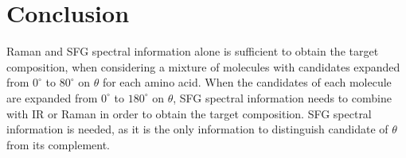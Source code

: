 \section{Conclusion}
Raman and SFG spectral information alone is sufficient to obtain the target composition, when considering a mixture of molecules with candidates expanded from $0^{\circ}$ to $80^{\circ}$ on $\theta$ for each amino acid. When the candidates of each molecule are expanded from $0^{\circ}$ to $180^{\circ}$ on $\theta$, SFG spectral information needs to combine with IR or Raman in order to obtain the target composition. SFG spectral information is needed, as it is the only information to distinguish candidate of $\theta$ from its complement.\\
